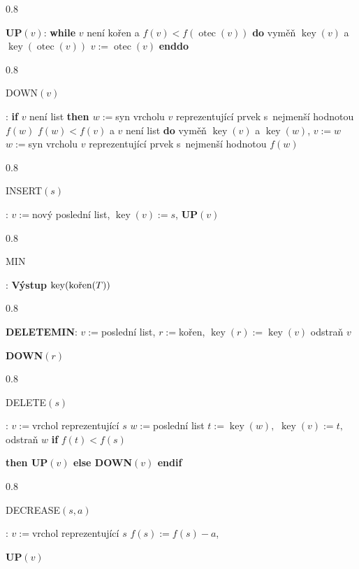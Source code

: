 \documentclass[a4paper,12pt]{article}
\DeclareMathOperator*{\otec}{otec}
\DeclareMathOperator*{\key}{key}
\newcommand{\algoritmus}[1]{
  {
  \setlength\fboxrule{0.5pt}

  \begin{boxedminipage}{0.8\textwidth}

 #1
  \end{boxedminipage}

  }
  }
\begin{document}
 
\algoritmus{
{\bf UP$(v)$}:\newline 
{\bf while} $v$ není kořen a $f(v)<f(\otec(v))$ {\bf do\newline 
\phantom{{\rm ---}}}vyměň $\key(v)$ a $\key(\otec(v))$\newline 
\phantom{---}$v:=\otec(v)$\newline 
{\bf enddo
}}\algoritmus{{\bf

DOWN$(v)$}:\newline 
{\bf if} $v$ není list {\bf then\newline 
\phantom{{{\rm ---}}}$w:=$}syn vrcholu $v$ reprezentující prvek s~nejmenší 
hodnotou $f(w)$\newline 
\phantom{---}{\bf while} $f(w)<f(v)$ a $v$ není list {\bf do\newline 
\phantom{{\rm ------}}}vyměň $\key(v)$ a $\key(w)$, $v:=w$\newline 
\phantom{------}$w:=$syn vrcholu $v$ reprezentující prvek s~nejmenší 
hodnotou $f(w)$\newline 
\phantom{---}{\bf enddo\newline 
endif
}}\algoritmus{{\bf

INSERT$(s)$}:\newline 
$v:=$nový poslední list, $\key(v):=s$, {\bf UP$(v)$
}}\algoritmus{{\bf

MIN}:\newline 
{\bf Výstup} $\key(\text{\rm kořen}(T))$

}\algoritmus{


{\bf DELETEMIN}:\newline 
$v:=$poslední list, $r:=$kořen, $\key(r):=\key(v)$\newline 
odstraň $v$\newline 
{\bf DOWN$(r)$

}}\algoritmus{{\bf

DELETE$(s)$}:\newline 
$v:=$vrchol reprezentující $s$\newline 
$w:=$poslední list\newline 
$t:=\key(w),$ $\key(v):=t,$ odstraň $w$\newline 
{\bf if} $f(t)<f(s)$ {\bf then UP$(v)$ else DOWN$(v)$ endif

}}\algoritmus{{\bf

DECREASE$(s,a)$}:\newline 
$v:=$vrchol reprezentující $s$\newline 
$f(s):=f(s)-a$, {\bf UP$(v)$

}}
\end{document}
